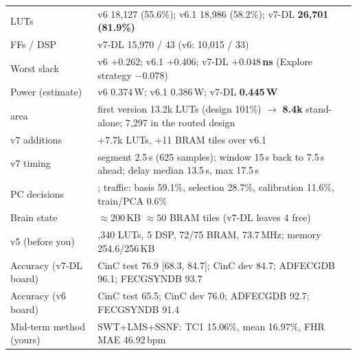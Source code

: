 \documentclass[11pt]{article}
\newcommand{\mods}[1]{\texttt{\detokenize{#1}}}   %
\begin{document}
\begin{table}[H]
\begin{tabularx}{\linewidth}{@{}>{\raggedright\arraybackslash}p{3.9cm}>{\raggedright\arraybackslash}X@{}}
LUTs & v6 18,127 (55.6\%); v6.1 18,986 (58.2\%); v7-DL \textbf{26,701 (81.9\%)} \\
FFs / DSP & v7-DL 15,970 / 43 (v6: 10,015 / 33) \\
Worst slack & v6 $+0.262$; v6.1 $+0.406$; v7-DL \textbf{$+0.048$\,ns} (Explore strategy $-0.078$) \\
Power (estimate) & v6 0.374\,W; v6.1 0.386\,W; v7-DL \textbf{0.445\,W} \\
\mods{v7_la} area & first version 13.2k LUTs (design 101\%) $\to$ \textbf{8.4k} stand-alone; 7,297 in the routed design \\
v7 additions & +7.7k LUTs, +11 BRAM tiles over v6.1 \\
v7 timing & segment 2.5\,s (625 samples); window 15\,s back to 7.5\,s ahead; delay median 13.5\,s, max 17.5\,s \\
PC decisions & 5; traffic: basis 59.1\%, selection 28.7\%, calibration 11.6\%, train/PCA 0.6\% \\
Brain state & $\approx 200$\,KB $\approx 50$ BRAM tiles (v7-DL leaves 4 free) \\
v5 (before you) & 3,340 LUTs, 5 DSP, 72/75 BRAM, 73.7\,MHz; memory 254.6/256\,KB \\
Accuracy (v7-DL board) & CinC test 76.9 [68.3, 84.7]; CinC dev 84.7; ADFECGDB 96.1; FECGSYNDB 93.7 \\
Accuracy (v6 board) & CinC test 65.5; CinC dev 76.0; ADFECGDB 92.7; FECGSYNDB 91.4 \\
Mid-term method (yours) & SWT+LMS+SSNF: TC1 15.06\%, mean 16.97\%, FHR MAE 46.92\,bpm \\
\bottomrule
\end{tabularx}
\end{table}
\end{document}
